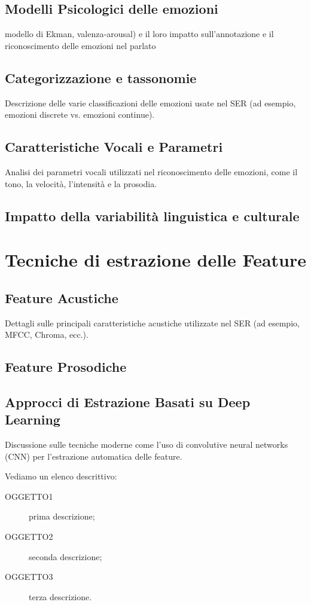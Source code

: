 \subsection{Modelli Psicologici delle emozioni}
modello di Ekman, valenza-arousal) e il loro impatto sull'annotazione e il riconoscimento delle emozioni nel parlato
\subsection{Categorizzazione e tassonomie}
Descrizione delle varie classificazioni delle emozioni usate nel SER (ad esempio, emozioni discrete vs. emozioni continue).
\subsection{Caratteristiche Vocali e Parametri}
Analisi dei parametri vocali utilizzati nel riconoscimento delle emozioni, come il tono, la velocità, l'intensità e la prosodia.
\subsection{Impatto della variabilità linguistica e culturale}

\section{Tecniche di estrazione delle Feature}
\subsection{Feature Acustiche}
Dettagli sulle principali caratteristiche acustiche utilizzate nel SER (ad esempio, MFCC, Chroma, ecc.).
\subsection{Feature Prosodiche}

\subsection{Approcci di Estrazione Basati su Deep Learning}
Discussione sulle tecniche moderne come l'uso di convolutive neural networks (CNN) per l'estrazione automatica delle feature.

Vediamo un elenco descrittivo:
\begin{description}                     %
  \item[OGGETTO1] prima descrizione;
  \item[OGGETTO2] seconda descrizione;
  \item[OGGETTO3] terza descrizione.
\end{description}


